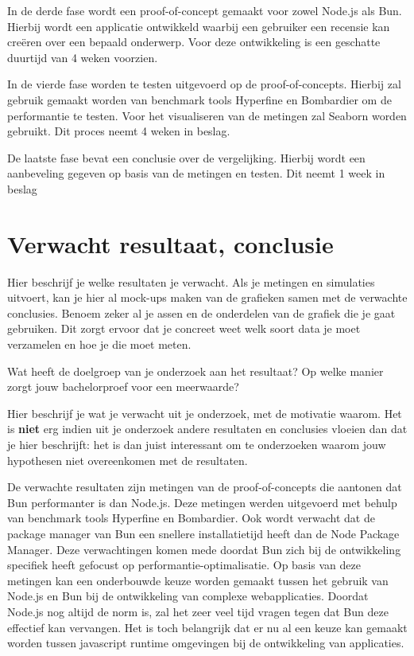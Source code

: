 In de derde fase wordt een proof-of-concept gemaakt voor zowel Node.js als Bun. 
Hierbij wordt een applicatie ontwikkeld waarbij een gebruiker een recensie kan creëren over een bepaald onderwerp.
Voor deze ontwikkeling is een geschatte duurtijd van 4 weken voorzien.

In de vierde fase worden te testen uitgevoerd op de proof-of-concepts. 
Hierbij zal gebruik gemaakt worden van benchmark tools Hyperfine en Bombardier om de performantie te testen.
Voor het visualiseren van de metingen zal Seaborn worden gebruikt.
Dit proces neemt 4 weken in beslag.

De laatste fase bevat een conclusie over de vergelijking. 
Hierbij wordt een aanbeveling gegeven op basis van de metingen en testen.
Dit neemt 1 week in beslag
\section{Verwacht resultaat, conclusie}%
\label{sec:verwachte_resultaten}

Hier beschrijf je welke resultaten je verwacht. Als je metingen en simulaties uitvoert, 
kan je hier al mock-ups maken van de grafieken samen met de verwachte conclusies. 
Benoem zeker al je assen en de onderdelen van de grafiek die je gaat gebruiken. 
Dit zorgt ervoor dat je concreet weet welk soort data je moet verzamelen en hoe je die moet meten.

Wat heeft de doelgroep van je onderzoek aan het resultaat? Op welke manier zorgt jouw bachelorproef voor een meerwaarde?

Hier beschrijf je wat je verwacht uit je onderzoek, met de motivatie waarom.
Het is \textbf{niet} erg indien uit je onderzoek andere resultaten en conclusies vloeien dan dat je hier beschrijft: 
het is dan juist interessant om te onderzoeken waarom jouw hypothesen niet overeenkomen met de resultaten.


De verwachte resultaten zijn metingen van de proof-of-concepts die aantonen dat Bun performanter is dan Node.js. 
Deze metingen werden uitgevoerd met behulp van benchmark tools Hyperfine en Bombardier.
Ook wordt verwacht dat de package manager van Bun een snellere installatietijd heeft dan de Node Package Manager.
Deze verwachtingen komen mede doordat Bun zich bij de ontwikkeling specifiek heeft gefocust op performantie-optimalisatie.
Op basis van deze metingen kan een onderbouwde keuze worden gemaakt tussen het gebruik van Node.js en Bun bij de ontwikkeling
van complexe webapplicaties.
Doordat Node.js nog altijd de norm is, zal het zeer veel tijd vragen tegen dat Bun deze effectief kan vervangen.
Het is toch belangrijk dat er nu al een keuze kan gemaakt worden tussen javascript runtime
 omgevingen bij de ontwikkeling van applicaties.

